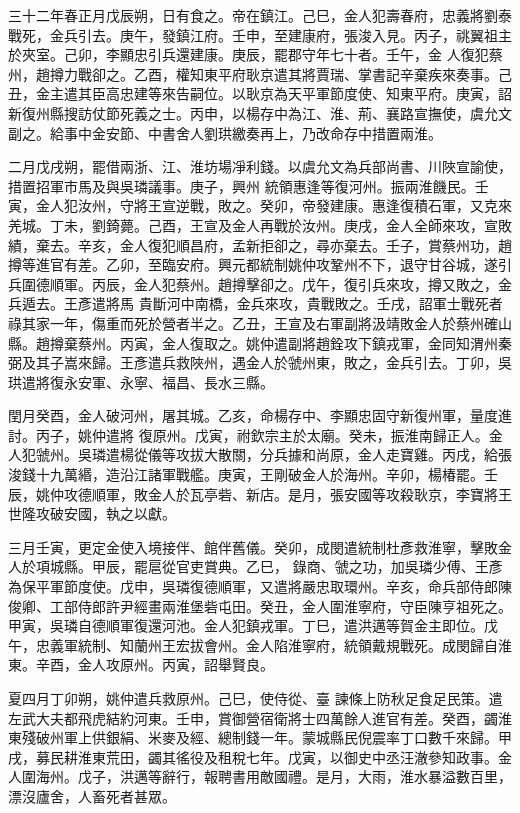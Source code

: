 \begin{pinyinscope}
 三十二年春正月戊辰朔，日有食之。帝在鎮江。己巳，金人犯壽春府，忠義將劉泰戰死，金兵引去。庚午，發鎮江府。壬申，至建康府，張浚入見。丙子，祧翼祖主於夾室。己卯，李顯忠引兵還建康。庚辰，罷郡守年七十者。壬午，金
 人復犯蔡州，趙撙力戰卻之。乙酉，權知東平府耿京遣其將賈瑞、掌書記辛棄疾來奏事。己丑，金主遣其臣高忠建等來告嗣位。以耿京為天平軍節度使、知東平府。庚寅，詔新復州縣搜訪仗節死義之士。丙申，以楊存中為江、淮、荊、襄路宣撫使，虞允文副之。給事中金安節、中書舍人劉珙繳奏再上，乃改命存中措置兩淮。



 二月戊戌朔，罷借兩浙、江、淮坊場凈利錢。以虞允文為兵部尚書、川陜宣諭使，措置招軍市馬及與吳璘議事。庚子，興州
 統領惠逢等復河州。振兩淮饑民。壬寅，金人犯汝州，守將王宣逆戰，敗之。癸卯，帝發建康。惠逢復積石軍，又克來羌城。丁未，劉錡薨。己酉，王宣及金人再戰於汝州。庚戌，金人全師來攻，宣敗績，棄去。辛亥，金人復犯順昌府，孟新拒卻之，尋亦棄去。壬子，賞蔡州功，趙撙等進官有差。乙卯，至臨安府。興元都統制姚仲攻鞏州不下，退守甘谷城，遂引兵圍德順軍。丙辰，金人犯蔡州。趙撙擊卻之。戊午，復引兵來攻，撙又敗之，金兵遁去。王彥遣將馬
 貴斷河中南橋，金兵來攻，貴戰敗之。壬戌，詔軍士戰死者祿其家一年，傷重而死於營者半之。乙丑，王宣及右軍副將汲靖敗金人於蔡州確山縣。趙撙棄蔡州。丙寅，金人復取之。姚仲遣副將趙銓攻下鎮戎軍，金同知渭州秦弼及其子嵩來歸。王彥遣兵救陜州，遇金人於虢州東，敗之，金兵引去。丁卯，吳珙遣將復永安軍、永寧、福昌、長水三縣。



 閏月癸酉，金人破河州，屠其城。乙亥，命楊存中、李顯忠固守新復州軍，量度進討。丙子，姚仲遣將
 復原州。戊寅，祔欽宗主於太廟。癸未，振淮南歸正人。金人犯虢州。吳璘遣楊從儀等攻拔大散關，分兵據和尚原，金人走寶雞。丙戌，給張浚錢十九萬緡，造沿江諸軍戰艦。庚寅，王剛破金人於海州。辛卯，楊椿罷。壬辰，姚仲攻德順軍，敗金人於瓦亭砦、新店。是月，張安國等攻殺耿京，李寶將王世隆攻破安國，執之以獻。



 三月壬寅，更定金使入境接伴、館伴舊儀。癸卯，成閔遣統制杜彥救淮寧，擊敗金人於項城縣。甲辰，罷扈從官吏賞典。乙巳，
 錄商、虢之功，加吳璘少傅、王彥為保平軍節度使。戊申，吳璘復德順軍，又遣將嚴忠取環州。辛亥，命兵部侍郎陳俊卿、工部侍郎許尹經畫兩淮堡砦屯田。癸丑，金人圍淮寧府，守臣陳亨祖死之。甲寅，吳璘自德順軍復還河池。金人犯鎮戎軍。丁巳，遣洪邁等賀金主即位。戊午，忠義軍統制、知蘭州王宏拔會州。金人陷淮寧府，統領戴規戰死。成閔歸自淮東。辛酉，金人攻原州。丙寅，詔舉賢良。



 夏四月丁卯朔，姚仲遣兵救原州。己巳，使侍從、臺
 諫條上防秋足食足民策。遣左武大夫都飛虎結約河東。壬申，賞御營宿衛將士四萬餘人進官有差。癸酉，蠲淮東殘破州軍上供銀絹、米麥及經、總制錢一年。蒙城縣民倪震率丁口數千來歸。甲戌，募民耕淮東荒田，蠲其徭役及租稅七年。戊寅，以御史中丞汪澈參知政事。金人圍海州。戊子，洪邁等辭行，報聘書用敵國禮。是月，大雨，淮水暴溢數百里，漂沒廬舍，人畜死者甚眾。




\end{pinyinscope}
